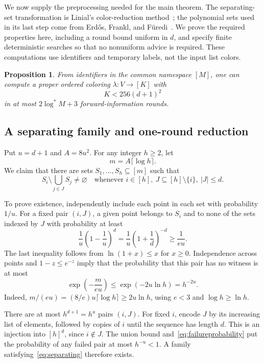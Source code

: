 \documentclass[11pt,a4paper]{article}
\numberwithin{equation}{section}
\newtheorem{proposition}[theorem]{Proposition}
\newcommand{\logstar}{\log^{*}}
\begin{document}
We now supply the preprocessing needed for the main theorem.
The separating-set transformation is Linial's color-reduction
method~\cite[Section~4]{Linial92}; the polynomial sets used in its
last step come from Erd\H{o}s, Frankl, and F\"uredi~\cite[Example~3.2]{EFF85}.
We prove the required properties here, including a round bound
uniform in \(d\), and specify finite deterministic searches so that
no nonuniform advice is required. These computations use identifiers
and temporary labels, not the input list colors.

\begin{proposition}
\label{prop:preprocessing}
From identifiers in the common namespace \([M]\), one can compute
a proper ordered coloring \(\lambda:V\to[K]\) with
\[
 K<256(d+1)^2
\]
in at most \(2\logstar M+3\) forward-information rounds.
\end{proposition}

\subsection{A separating family and one-round reduction}

Put \(u=d+1\) and \(A=8u^2\). For any integer \(h\geq2\), let
\[
 m=A\lceil\log h\rceil.
\]
We claim that there are sets \(S_1,\ldots,S_h\subseteq[m]\) such that
\begin{equation}
 S_i\setminus\bigcup_{j\in J}S_j\neq\varnothing
 \quad\text{whenever }i\in[h],\
 J\subseteq[h]\setminus\{i\},\ |J|\leq d.
 \label{eq:separating}
\end{equation}

To prove existence, independently include each point in each set
with probability \(1/u\). For a fixed pair \((i,J)\), a given point
belongs to \(S_i\) and to none of the sets indexed by \(J\) with
probability at least
\[
 \frac1u\left(1-\frac1u\right)^d
 =\frac1u\left(1+\frac1d\right)^{-d}
 \geq\frac1{eu}.
\]
The last inequality follows from \(\ln(1+x)\leq x\) for \(x\geq0\).
Independence across points and \(1-z\leq e^{-z}\) imply that
the probability that this pair has no witness is at most
\begin{equation}
 \exp\!\left(-\frac{m}{eu}\right)
 \leq \exp(-2u\ln h)=h^{-2u}.
 \label{eq:failureprobability}
\end{equation}
Indeed, \(m/(eu)=(8/e)u\lceil\log h\rceil\geq2u\ln h\),
using \(e<3\) and \(\log h\geq\ln h\).

There are at most \(h^{d+1}=h^u\) pairs \((i,J)\).
For fixed \(i\), encode \(J\) by its increasing list of elements,
followed by copies of \(i\) until the sequence has length \(d\).
This is an injection into \([h]^d\), since \(i\notin J\).
The union bound and~\eqref{eq:failureprobability} put the probability
of any failed pair at most \(h^{-u}<1\). A family
satisfying~\eqref{eq:separating} therefore exists.
\end{document}
